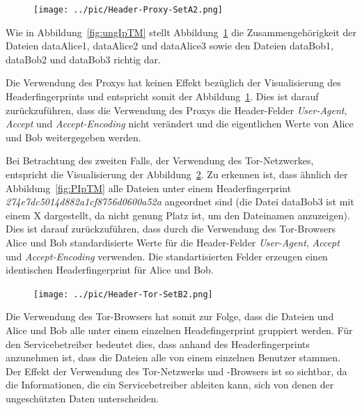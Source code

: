 \documentclass[
    fontsize=12pt,
    headings=small,
    parskip=half,           %
    bibliography=totoc,
    numbers=noenddot,       %
    open=any,               %
    ]{scrreprt}
\begin{document}
\begin{figure}[H]
\texttt{[image: ../pic/Header-Proxy-SetA2.png]}
\label{fig:ungHTM}
\end{figure}

Wie in Abbildung~\ref{fig:ungIpTM} stellt Abbildung~\ref{fig:ungHTM} die Zusammengehörigkeit der Dateien dataAlice1, dataAlice2 und dataAlice3 sowie den Dateien dataBob1, dataBob2 und dataBob3 richtig dar.

Die Verwendung des Proxys hat keinen Effekt bezüglich der Visualisierung des Headerfingerprints und entspricht somit der Abbildung~\ref{fig:ungHTM}.
Dies ist darauf zurückzuführen, dass die Verwendung des Proxys die Header-Felder \textit{User-Agent}, \textit{Accept} und \textit{Accept-Encoding} nicht verändert und die eigentlichen Werte von Alice und Bob weitergegeben werden.

Bei Betrachtung des zweiten Falls, der Verwendung des Tor-Netzwerkes, entspricht die Visualisierung der Abbildung~\ref{fig:THTM}.
Zu erkennen ist, dass ähnlich der Abbildung~\ref{fig:PIpTM} alle Dateien unter einem Headerfingerprint \textit{274e7dc5014d882a1cf8756d0600a52a} angeordnet sind (die Datei dataBob3 ist mit einem X dargestellt, da nicht genung Platz ist, um den Dateinamen anzuzeigen).
Dies ist darauf zurückzuführen, dass durch die Verwendung des Tor-Browsers Alice und Bob standardisierte Werte für die Header-Felder \textit{User-Agent}, \textit{Accept} und \textit{Accept-Encoding} verwenden.
Die standartisierten Felder erzeugen einen identischen Headerfingerprint für Alice und Bob.

\begin{figure}[H]
\texttt{[image: ../pic/Header-Tor-SetB2.png]}
\label{fig:THTM}
\end{figure}

Die Verwendung des Tor-Browsers hat somit zur Folge, dass die Dateien und Alice und Bob alle unter einem einzelnen Headefingerprint gruppiert werden. 
Für den Servicebetreiber bedeutet dies, dass anhand des Headerfingerprints anzunehmen ist, dass die Dateien alle von einem einzelnen Benutzer stammen. 
Der Effekt der Verwendung des Tor-Netzwerks und -Browsers ist so sichtbar, da die Informationen, die ein Servicebetreiber ableiten kann, sich von denen der ungeschützten Daten unterscheiden.
\end{document}
